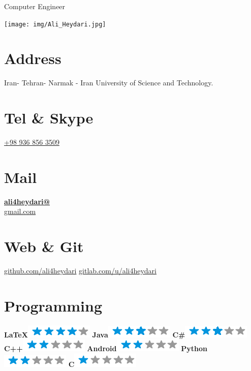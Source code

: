 \documentclass[a4paper]{friggeri-cv}
\begin{document}
      {Computer Engineer}


\begin{aside}
  \texttt{[image: img/Ali\_Heydari.jpg]}
  \section{Address}
Iran- Tehran- Narmak -
Iran University of Science and Technology.
    ~
  \section{Tel \& Skype}
   \href{tel:+989368563509}{+98 936 856 3509}
    ~
  \section{Mail}
 \href{mailto:ali4heydari@gmail.com}{\textbf{ali4heydari@}\\gmail.com}
    ~
  \section{Web \& Git}
     \href{https://github.com/ali4heydari}{github.com/ali4heydari}
    \href{https://gitlab.com/u/ali4heydari}{gitlab.com/u/ali4heydari}
    ~
  \section{Programming}
   \textbf{\LaTeX}\includegraphics[scale=0.40]{img/4stars.png}
    \textbf{Java}\includegraphics[scale=0.40]{img/3stars.png}
    \textbf{C\#}\includegraphics[scale=0.40]{img/3stars.png}
    \textbf{C++}\includegraphics[scale=0.40]{img/2stars.png}
    \textbf{Android}\includegraphics[scale=0.40]{img/2stars.png}
     \textbf{Python}\includegraphics[scale=0.40]{img/2stars.png}
     \textbf{C}\includegraphics[scale=0.40]{img/1stars.png}
    ~

\end{aside}
\end{document}
